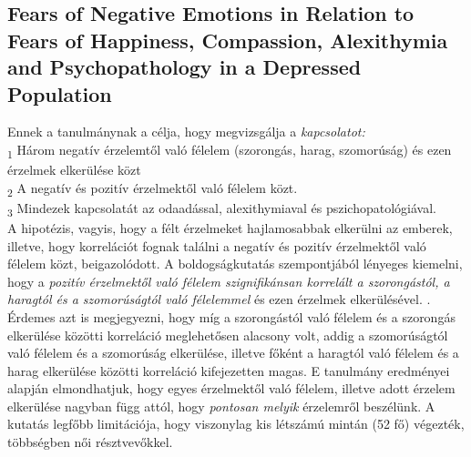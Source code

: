 \subsection*{Fears of Negative Emotions in Relation to Fears of Happiness, Compassion,
	Alexithymia and Psychopathology in a Depressed Population \cite{gilbert_2014}}
 Ennek a tanulmánynak a célja, hogy megvizsgálja a \textit{kapcsolatot:}\\
 \textsubscript{1} Három negatív érzelemtől való félelem (szorongás, harag, szomorúság) és ezen érzelmek elkerülése közt \\
 \textsubscript{2} A negatív és pozitív érzelmektől való félelem közt.\\
 \textsubscript{3} Mindezek kapcsolatát az odaadással, alexithymiaval és pszichopatológiával.\\
 A hipotézis, vagyis, hogy a félt érzelmeket hajlamosabbak elkerülni az emberek, illetve, hogy korrelációt fognak találni a negatív és pozitív érzelmektől való félelem közt, beigazolódott. A boldogságkutatás szempontjából lényeges kiemelni, hogy a \textit{pozitív érzelmektől való félelem szignifikánsan korrelált a szorongástól, a haragtól és a szomorúságtól való félelemmel} és ezen érzelmek elkerülésével. \cite{gilbert_2014}. Érdemes azt is megjegyezni, hogy míg a szorongástól való félelem és a szorongás elkerülése közötti korreláció meglehetősen alacsony volt, addig a szomorúságtól való félelem és a szomorúság elkerülése, illetve főként a haragtól való félelem és a harag elkerülése közötti korreláció kifejezetten magas\cite{gilbert_2014}. E tanulmány eredményei alapján elmondhatjuk, hogy egyes érzelmektől való félelem, illetve adott érzelem elkerülése nagyban függ attól, hogy \textit{pontosan melyik} érzelemről beszélünk. A kutatás legfőbb limitációja, hogy viszonylag kis létszámú mintán (52 fő) végezték, többségben női résztvevőkkel.
 
